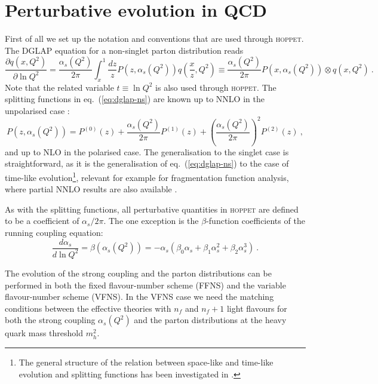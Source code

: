 \documentclass[12pt]{article}
\newcommand{\lp}{\left(}
\newcommand{\rp}{\right)}
\newcommand{\aq}{\alpha_s\left( Q^2 \right)}
\newcommand{\as}{\alpha_s}
\newcommand{\hoppet}{\textsc{hoppet}\xspace}
\begin{document}
\section{Perturbative evolution in QCD}
\label{sec:pqcd}
First of all we set up the notation and
conventions that are used through \hoppet. The DGLAP
equation for a non-singlet parton distribution reads
\begin{equation}
  \label{eq:dglap-ns}
  \frac{\partial q(x,Q^2)}{\partial \ln Q^2} = 
\frac{\aq}{2\pi}\int_x^1 \frac{dz}{z}
  P(z,\aq) q\lp \frac{x}{z},Q^2\rp \equiv 
\frac{\aq}{2\pi}  P(x,\aq) \otimes q\lp x,Q^2\rp \ .
\end{equation}
Note that the related variable $t\equiv \ln Q^2$ is also used
through \hoppet.
The splitting functions in  eq.~(\ref{eq:dglap-ns})
are known up to NNLO in the 
unpolarised case \cite{NNLO-NS,NNLO-singlet}:
\begin{equation}
  \label{eq:dpdf}
   P(z,\aq)=P^{(0)}(z)+\frac{\aq}{2\pi}P^{(1)}(z)+
\lp \frac{\aq}{2\pi} \rp^2 P^{(2)}(z) \ ,
\end{equation}
and up to NLO in the polarised case.
The generalisation to the singlet case is straightforward, as it
is the generalisation of eq.~(\ref{eq:dglap-ns}) to the case
of time-like evolution\footnote{
The general structure of the relation between space-like
and time-like evolution and splitting functions
 has been investigated in \cite{Dokshitzer:2005bf,Mitov:2006ic,Basso:2006nk,Dokshitzer:2006nm,Beccaria:2007bb}.}, 
relevant for example for fragmentation function analysis,
where partial NNLO results
are also available \cite{Mitov:2006ic}.


As with the splitting functions, all perturbative quantities in
\hoppet are defined to be a coefficient of $\as/2\pi$. The one
exception is the $\beta$-function coefficients of the running
coupling equation:
\begin{equation}
  \label{eq:as-ev}
  \frac{d\as}{d\ln Q^2} = \beta\lp \aq\rp = -\as (\beta_0\as +
  \beta_1\as^2 + 
  \beta_2\as^3) \ .
\end{equation}

The evolution of the strong coupling and the parton distributions can
be performed in both the fixed flavour-number scheme (FFNS) and the 
variable flavour-number scheme (VFNS). In the VFNS case we 
need the matching conditions between the effective
theories with $n_f$ and $n_{f}+1$ light flavours for both the strong 
coupling $\aq$ and the parton distributions at the heavy quark
mass threshold $m_h^2$.
\end{document}
